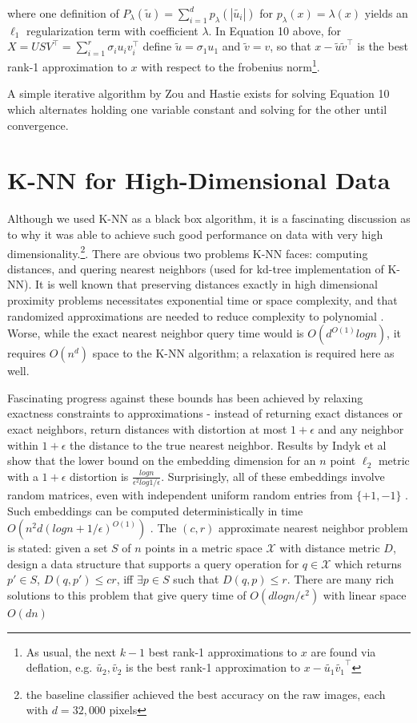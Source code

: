 \documentclass[11pt,letterpaper]{article}
\begin{document}
where one definition of $P_{\lambda}(\tilde{u}) = \sum_{i = 1}^d p_{\lambda}(|\tilde{u_i}|)$ for $p_{\lambda}(x) = \lambda(x)$ yields an $\ell_1$ regularization term with coefficient $\lambda$. In Equation 10 above, for $X = USV^{\top} = \sum_{i = 1}^r \sigma_iu_iv_i^{\top}$ define $\tilde{u} = \sigma_1u_1$ and $\tilde{v} = v$, so that $x - \tilde{u}\tilde{v}^{\top}$ is the best rank-1 approximation to $x$ with respect to the frobenius norm\footnote{As usual, the next $k-1$ best rank-1 approximations to $x$ are found via deflation, e.g. $\tilde{u_2}, \tilde{v_2}$ is the best rank-1 approximation to $x - \tilde{u_1}\tilde{v_1}^{\top}$}. 

A simple iterative algorithm by Zou and Hastie\cite{zou} exists for solving Equation 10 which alternates holding one variable constant and solving for the other until convergence. 

\section{K-NN for High-Dimensional Data}

Although we used K-NN as a black box algorithm, it is a fascinating discussion as to why it was able to achieve such good performance on data with very high dimensionality.\footnote{the baseline classifier achieved the best accuracy on the raw images, each with $d = 32,000$ pixels}. There are obvious two problems K-NN faces: computing distances, and quering nearest neighbors (used for kd-tree implementation of K-NN). It is well known that preserving distances exactly in high dimensional proximity problems necessitates exponential time or space complexity, and that randomized approximations are needed to reduce complexity to polynomial \cite{JL1}. Worse, while the exact nearest neighbor query time would is $O(d^{O(1)}logn)$, it requires $O(n^d)$ space \cite{clarkson} to the K-NN algorithm; a relaxation is required here as well. 

Fascinating progress against these bounds has been achieved by relaxing exactness constraints to approximations - instead of returning exact distances or exact neighbors, return distances with distortion at most $1 + \epsilon$ and any neighbor within $1 + \epsilon$ the distance to the true nearest neighbor. Results by Indyk et al show that the lower bound on the embedding dimension for an $n$ point $\ell_2$ metric with a $1 + \epsilon$ distortion is $\frac{logn}{\epsilon^2log1/\epsilon}$. Surprisingly, all of these embeddings involve random matrices, even with independent uniform random entries from $\{+1, -1\}$ \cite{Achlioptas}. Such embeddings can be computed deterministically in time $O(n^2d(logn + 1/\epsilon)^{O(1)})$ \cite{engebretsen}. The $(c, r)$ approximate nearest neighbor problem is stated: given a set $S$ of $n$ points in a metric space $\mathcal{X}$ with distance metric $D$, design a data structure that supports a query operation for $q \in \mathcal{X}$ which returns $p' \in S$, $D(q, p') \leq cr$, iff  $\exists p \in S$ such that $D(q, p) \leq r$. There are many rich solutions to this problem that give query time of $O(dlogn/{\epsilon^2})$ with linear space $O(dn)$ \cite{kushilevitz}
\end{document}
